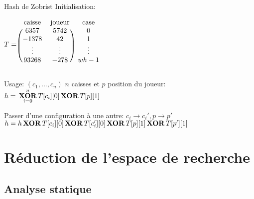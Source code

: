             \begin{frame}{Hash de Zobrist}
                Initialisation:

                \begin{center}
                    $T=\begin{blockarray}{ccc}
                            \text{caisse} & \text{joueur} & \text{case} \\
                        \begin{block}{(cc)c}
                            6357   & 5742   & 0      \\
                            -1378  & 42     & 1      \\
                            \vdots & \vdots & \vdots \\
                            93268  & -278   & wh - 1 \\
                        \end{block}
                    \end{blockarray}$
                \end{center}

                Usage:
                $(c_1, ..., c_n)$ $n$ caisses et $p$ position du joueur:
                $h = \underset{i=0}{\overset{n}{\, \text{\textbf{XOR}} \,}} T[c_i][0] \, \text{\textbf{XOR}} \, T[p][1]$

                Passer d'une configuration à une autre:
                $c_i \rightarrow c_i', p \rightarrow p'$
                $h = h \, \text{\textbf{XOR}} \, T[c_i][0] \, \text{\textbf{XOR}} \, T[c_i'][0] \, \text{\textbf{XOR}} \, T[p][1] \, \text{\textbf{XOR}} \, T[p'][1]$
            \end{frame}

    \section{Réduction de l'espace de recherche}

        \subsection{Analyse statique}

